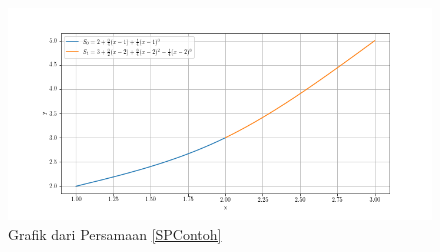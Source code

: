 \begin{contoh}
\begin{figure}[H]
		\centering
		\includegraphics[width=14cm]{Images/ContohCubicSpline}
		\caption{Grafik dari Persamaan \eqref{SPContoh}}
	\end{figure}
	
\end{contoh}


